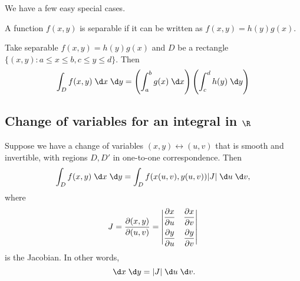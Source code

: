 \documentclass[a4paper]{article}
\begin{document}
We have a few easy special cases.
\begin{defi}
  A function $f(x, y)$ is separable if it can be written as $f(x, y) = h(y)g(x)$.
\end{defi}

\begin{prop}
  Take separable $f(x, y) = h(y)g(x)$ and $D$ be a rectangle $\{(x, y): a\leq x\leq b, c\leq y \leq d\}$. Then
  \[
    \int_Df(x, y)\;\d x\;\d y = \left(\int_a^b g(x)\;\d x\right)\left(\int_c^d h(y)\;\d y\right)
  \]
\end{prop}

\subsection{Change of variables for an integral in \texorpdfstring{$\R$}{R}}
\begin{prop}
  Suppose we have a change of variables $(x, y)\leftrightarrow (u, v)$ that is smooth and invertible, with regions $D, D'$ in one-to-one correspondence. Then
  \[
    \int_D f(x, y)\;\d x\;\d y = \int_D f(x(u, v), y(u, v))|J|\;\d u\;\d v,
  \]
  where
  \[
    J = \frac{\partial (x, y)}{\partial (u, v)} =
    \begin{vmatrix}
      \dfrac{\partial x}{\partial u} & \dfrac{\partial x}{\partial v}\vspace{5pt}\\
      \dfrac{\partial y}{\partial u} & \dfrac{\partial y}{\partial v}\\
    \end{vmatrix}
  \]
  is the Jacobian. In other words,
  \[
    \;\d x\;\d y = |J|\;\d u\;\d v.
  \]
\end{prop}
\end{document}
